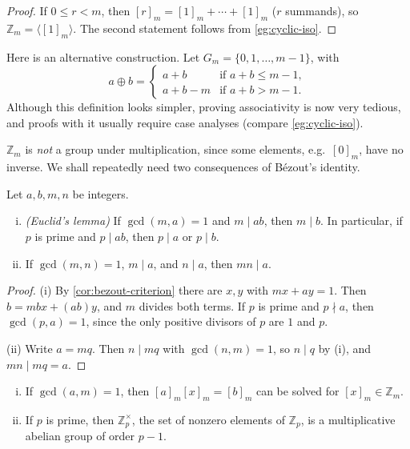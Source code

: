 \begin{proof}
	If \(0 \leq r < m\), then \([r]_m = [1]_m + \cdots + [1]_m\) (\(r\) summands), so
	\(\mathbb Z_m = \langle[1]_m\rangle\). The second statement follows from
	\autoref{eg:cyclic-iso}.
\end{proof}

\begin{remark}
	Here is an alternative construction. Let \(G_m = \{0, 1, \dots, m-1\}\), with
	\[
		a \oplus b = \begin{cases}
			a + b     & \text{if } a + b \leq m-1, \\
			a + b - m & \text{if } a + b > m-1.
		\end{cases}
	\]
	Although this definition looks simpler, proving associativity is now very tedious, and
	proofs with it usually require case analyses (compare \autoref{eg:cyclic-iso}).
\end{remark}

\(\mathbb Z_m\) is \emph{not} a group under multiplication, since some elements, e.g.\
\([0]_m\), have no inverse. We shall repeatedly need two consequences of B\'ezout's identity.

\begin{lemma}\label{lem:coprime-divisibility}
	Let \(a, b, m, n\) be integers.
	\begin{enumerate}[(i)]
		\item \emph{(Euclid's lemma)} If \(\gcd(m, a) = 1\) and \(m \mid ab\), then
		      \(m \mid b\). In particular, if \(p\) is prime and \(p \mid ab\), then
		      \(p \mid a\) or \(p \mid b\).
		\item If \(\gcd(m, n) = 1\), \(m \mid a\), and \(n \mid a\), then \(mn \mid a\).
	\end{enumerate}
\end{lemma}

\begin{proof}
	(i) By \autoref{cor:bezout-criterion} there are \(x, y\) with \(mx + ay = 1\). Then
	\(b = mbx + (ab)y\), and \(m\) divides both terms. If \(p\) is prime and \(p \nmid a\),
	then \(\gcd(p, a) = 1\), since the only positive divisors of \(p\) are \(1\) and \(p\).

	(ii) Write \(a = mq\). Then \(n \mid mq\) with \(\gcd(n, m) = 1\), so \(n \mid q\) by
	(i), and \(mn \mid mq = a\).
\end{proof}

\begin{proposition}\label{prop:Zp-units}
	\begin{enumerate}[(i)]
		\item If \(\gcd(a, m) = 1\), then \([a]_m[x]_m = [b]_m\) can be solved for
		      \([x]_m \in \mathbb Z_m\).
		\item If \(p\) is prime, then \(\mathbb Z_p^\times\), the set of nonzero elements of
		      \(\mathbb Z_p\), is a multiplicative abelian group of order \(p - 1\).
	\end{enumerate}
\end{proposition}

